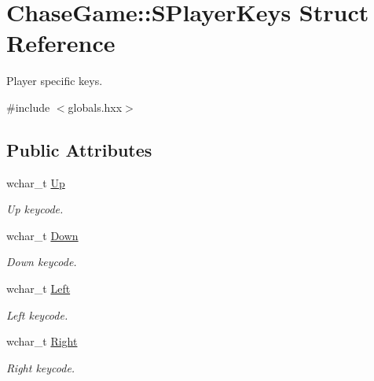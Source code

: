 \hypertarget{struct_chase_game_1_1_s_player_keys}{\section{Chase\-Game\-:\-:S\-Player\-Keys Struct Reference}
\label{struct_chase_game_1_1_s_player_keys}
}


Player specific keys.  




{\ttfamily \#include $<$globals.\-hxx$>$}

\subsection*{Public Attributes}
\begin{DoxyCompactItemize}
\item 
\hypertarget{struct_chase_game_1_1_s_player_keys_a0153d90bee31d3959e7a79377c4dd927}{wchar\-\_\-t \hyperlink{struct_chase_game_1_1_s_player_keys_a0153d90bee31d3959e7a79377c4dd927}{Up}}\label{struct_chase_game_1_1_s_player_keys_a0153d90bee31d3959e7a79377c4dd927}

\begin{DoxyCompactList}\small\item\em Up keycode. \end{DoxyCompactList}\item 
\hypertarget{struct_chase_game_1_1_s_player_keys_abe56af951c133c98b24401542f28ec9b}{wchar\-\_\-t \hyperlink{struct_chase_game_1_1_s_player_keys_abe56af951c133c98b24401542f28ec9b}{Down}}\label{struct_chase_game_1_1_s_player_keys_abe56af951c133c98b24401542f28ec9b}

\begin{DoxyCompactList}\small\item\em Down keycode. \end{DoxyCompactList}\item 
\hypertarget{struct_chase_game_1_1_s_player_keys_ab6c4f7e03fa43cd9443dcbd16a5e3250}{wchar\-\_\-t \hyperlink{struct_chase_game_1_1_s_player_keys_ab6c4f7e03fa43cd9443dcbd16a5e3250}{Left}}\label{struct_chase_game_1_1_s_player_keys_ab6c4f7e03fa43cd9443dcbd16a5e3250}

\begin{DoxyCompactList}\small\item\em Left keycode. \end{DoxyCompactList}\item 
\hypertarget{struct_chase_game_1_1_s_player_keys_a17ec0fea68ec78ad4577c6b56b83fa15}{wchar\-\_\-t \hyperlink{struct_chase_game_1_1_s_player_keys_a17ec0fea68ec78ad4577c6b56b83fa15}{Right}}\label{struct_chase_game_1_1_s_player_keys_a17ec0fea68ec78ad4577c6b56b83fa15}

\begin{DoxyCompactList}\small\item\em Right keycode. \end{DoxyCompactList}\end{DoxyCompactItemize}



